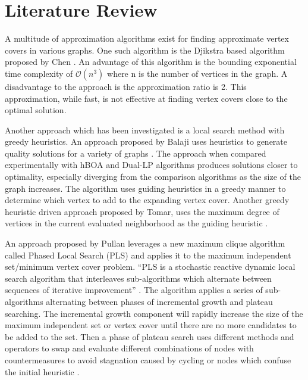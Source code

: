\documentclass[conference,letterpaper]{IEEEtran}
\begin{document}
\section{Literature Review}
\par A multitude of approximation algorithms exist for finding approximate vertex covers in various graphs. One such algorithm is the Djikstra based algorithm proposed by Chen \cite{chen16}. An advantage of this algorithm is the bounding exponential time complexity of $\mathcal{O}(n^{3})$ where n is the number of vertices in the graph. A disadvantage to the approach is the approximation ratio is 2. This approximation, while fast, is not effective at finding vertex covers close to the optimal solution.
\par Another approach which has been investigated is a local search method with greedy heuristics. An approach proposed by Balaji uses heuristics to generate quality solutions for a variety of graphs \cite{balaji13}. The approach when compared experimentally with hBOA and Dual-LP algorithms produces solutions closer to optimality, especially diverging from the comparison algorithms as the size of the graph increases. The algorithm uses guiding heuristics in a greedy manner to determine which vertex to add to the expanding vertex cover. Another greedy heuristic driven approach proposed by Tomar, uses the maximum degree of vertices in the current evaluated neighborhood as the guiding heuristic \cite{tomar14}.
\par An approach proposed by Pullan leverages a new maximum clique algorithm called Phased Local Search (PLS) \cite{pullan06} and applies it to the maximum independent set/minimum vertex cover problem. ``PLS is a stochastic reactive dynamic local search algorithm that interleaves sub-algorithms which alternate between sequences of iterative improvement'' \cite{pullan09}. The algorithm applies a series of sub-algorithms alternating between phases of incremental growth and plateau searching. The incremental growth component will rapidly increase the size of the maximum independent set or vertex cover until there are no more candidates to be added to the set. Then a phase of plateau search uses different methods and operators to swap and evaluate different combinations of nodes with countermeasures to avoid stagnation caused by cycling or nodes which confuse the initial heuristic \cite{pullan09}.
\end{document}
